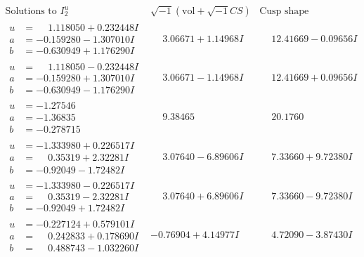 \documentclass[1p]{elsarticle_modified}
\theoremstyle{definition}
\newcommand{\I}{\sqrt{-1}}
\begin{document}
$$\begin{array}{c|c|c}  
\text{Solutions to }I^u_{2}& \I (\text{vol} + \sqrt{-1}CS) & \text{Cusp shape}\\
 \hline 
\begin{aligned}
u &= \phantom{-}1.118050 + 0.232448 I \\
a &= -0.159280 - 1.307010 I \\
b &= -0.630949 + 1.176290 I\end{aligned}
 & \phantom{-}3.06671 + 1.14968 I & \phantom{-}12.41669 - 0.09656 I \\ \hline\begin{aligned}
u &= \phantom{-}1.118050 - 0.232448 I \\
a &= -0.159280 + 1.307010 I \\
b &= -0.630949 - 1.176290 I\end{aligned}
 & \phantom{-}3.06671 - 1.14968 I & \phantom{-}12.41669 + 0.09656 I \\ \hline\begin{aligned}
u &= -1.27546\phantom{ +0.000000I} \\
a &= -1.36835\phantom{ +0.000000I} \\
b &= -0.278715\phantom{ +0.000000I}\end{aligned}
 & \phantom{-}9.38465\phantom{ +0.000000I} & \phantom{-}20.1760\phantom{ +0.000000I} \\ \hline\begin{aligned}
u &= -1.333980 + 0.226517 I \\
a &= \phantom{-}0.35319 + 2.32281 I \\
b &= -0.92049 - 1.72482 I\end{aligned}
 & \phantom{-}3.07640 - 6.89606 I & \phantom{-}7.33660 + 9.72380 I \\ \hline\begin{aligned}
u &= -1.333980 - 0.226517 I \\
a &= \phantom{-}0.35319 - 2.32281 I \\
b &= -0.92049 + 1.72482 I\end{aligned}
 & \phantom{-}3.07640 + 6.89606 I & \phantom{-}7.33660 - 9.72380 I \\ \hline\begin{aligned}
u &= -0.227124 + 0.579101 I \\
a &= \phantom{-}0.242833 + 0.178690 I \\
b &= \phantom{-}0.488743 - 1.032260 I\end{aligned}
 & -0.76904 + 4.14977 I & \phantom{-}4.72090 - 3.87430 I \\ \hline\begin{aligned}

\end{aligned}
\end{array}$$
\end{document}
